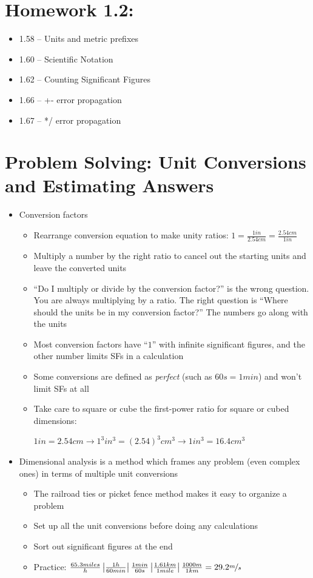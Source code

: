 \documentclass[12pt, openany, letterpaper]{memoir}
\begin{document}
\section*{Homework 1.2:}
\begin{itemize}
	\item 1.58 -- Units and metric prefixes
	\item 1.60 -- Scientific Notation
	\item 1.62 -- Counting Significant Figures
	\item 1.66 -- +- error propagation
	\item 1.67 -- */ error propagation
\end{itemize}

\section{Problem Solving: Unit Conversions and Estimating Answers}
\begin{itemize}
	\item Conversion factors
	      \begin{itemize}
		      \item Rearrange conversion equation to make unity ratios: $1=\frac{1in}{2.54cm}=\frac{2.54cm}{1in}$
		      \item Multiply a number by the right ratio to cancel out the starting units and leave the converted units
		      \item ``Do I multiply or divide by the conversion factor?'' is the wrong question. You are always multiplying by a ratio. The right question is ``Where should the units be in my conversion factor?'' The numbers go along with the units
		      \item Most conversion factors have ``$1$'' with infinite significant figures, and the other number limits SFs in a calculation
		      \item Some conversions are defined as \emph{perfect} (such as $60s=1min$) and won't limit SFs at all
		      \item Take care to square or cube the first-power ratio for square or cubed dimensions:

		            $1in=2.54cm\rightarrow1^3in^3=\left(2.54\right)^3cm^3\rightarrow 1in^3=16.4cm^3$
	      \end{itemize}
	\item Dimensional analysis is a method which frames any problem (even complex ones) in terms of multiple unit conversions
	      \begin{itemize}
		      \item The railroad ties or picket fence method makes it easy to organize a problem
		      \item Set up all the unit conversions before doing any calculations
		      \item Sort out significant figures at the end
		      \item Practice: $\frac{65.3miles}{h}\left|\frac{1h}{60min}\right|\frac{1min}{60s}\left|\frac{1.61km}{1mile}\right|\frac{1000m}{1km}=29.2\nicefrac{m}{s}$
	      \end{itemize}
\end{itemize}
\end{document}
